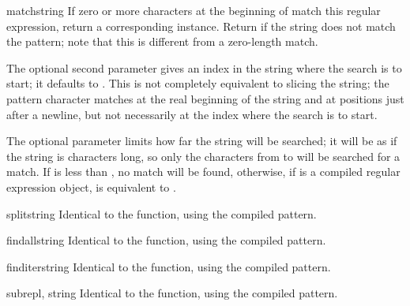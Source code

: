 \begin{methoddesc}[RegexObject]{match}{string}
  If zero or more characters at the beginning of  match
  this regular expression, return a corresponding
   instance.  Return  if the string does not
  match the pattern; note that this is different from a zero-length
  match.


  The optional second parameter  gives an index in the string
  where the search is to start; it defaults to .  This is not
  completely equivalent to slicing the string; the
   pattern
  character matches at the real beginning of the string and at positions
  just after a newline, but not necessarily at the index where the search
  is to start.

  The optional parameter  limits how far the string will
  be searched; it will be as if the string is  characters
  long, so only the characters from  to  will be searched for a match.  If  is less than
  , no match will be found, otherwise, if  is a
  compiled regular expression object,
   is equivalent to
  .
\end{methoddesc}

\begin{methoddesc}[RegexObject]{split}{string}
Identical to the  function, using the compiled pattern.
\end{methoddesc}

\begin{methoddesc}[RegexObject]{findall}{string}
Identical to the  function, using the compiled pattern.
\end{methoddesc}

\begin{methoddesc}[RegexObject]{finditer}{string}
Identical to the  function, using the compiled pattern.
\end{methoddesc}

\begin{methoddesc}[RegexObject]{sub}{repl, string}
Identical to the  function, using the compiled pattern.
\end{methoddesc}

